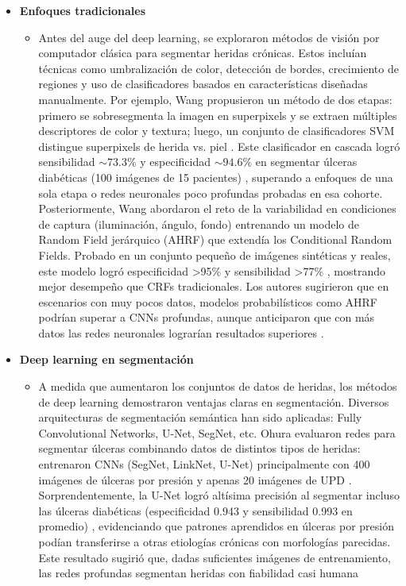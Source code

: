 \begin{itemize}
    \item \textbf{Enfoques tradicionales}
    \begin{itemize}
        \item Antes del auge del deep learning, se exploraron métodos de visión por computador clásica para segmentar heridas crónicas. Estos incluían técnicas como umbralización de color, detección de bordes, crecimiento de regiones y uso de clasificadores basados en características diseñadas manualmente. Por ejemplo, Wang \cite{Chemello2022} propusieron un método de dos etapas: primero se sobresegmenta la imagen en superpixels y se extraen múltiples descriptores de color y textura; luego, un conjunto de clasificadores SVM distingue superpixels de herida vs. piel . Este clasificador en cascada logró sensibilidad $\sim73.3\%$ y especificidad $\sim94.6\%$ en segmentar úlceras diabéticas (100 imágenes de 15 pacientes) , superando a enfoques de una sola etapa o redes neuronales poco profundas probadas en esa cohorte. Posteriormente, Wang \cite{Chemello2022}  abordaron el reto de la variabilidad en condiciones de captura (iluminación, ángulo, fondo) entrenando un modelo de Random Field jerárquico (AHRF) que extendía los Conditional Random Fields. Probado en un conjunto pequeño de imágenes sintéticas y reales, este modelo logró especificidad >95\% y sensibilidad >77\% , mostrando mejor desempeño que CRFs tradicionales. Los autores sugirieron que en escenarios con muy pocos datos, modelos probabilísticos como AHRF podrían superar a CNNs profundas, aunque anticiparon que con más datos las redes neuronales lograrían resultados superiores .
    \end{itemize}
    \item \textbf{Deep learning en segmentación}
    \begin{itemize}
        \item A medida que aumentaron los conjuntos de datos de heridas, los métodos de deep learning demostraron ventajas claras en segmentación. Diversos arquitecturas de segmentación semántica han sido aplicadas: Fully Convolutional Networks, U-Net, SegNet, etc. Ohura evaluaron redes para segmentar úlceras combinando datos de distintos tipos de heridas: entrenaron CNNs (SegNet, LinkNet, U-Net) principalmente con 400 imágenes de úlceras por presión y apenas 20 imágenes de UPD \cite{Chemello2022}. Sorprendentemente, la U-Net logró altísima precisión al segmentar incluso las úlceras diabéticas (especificidad 0.943 y sensibilidad 0.993 en promedio) , evidenciando que patrones aprendidos en úlceras por presión podían transferirse a otras etiologías crónicas con morfologías parecidas. Este resultado sugirió que, dadas suficientes imágenes de entrenamiento, las redes profundas segmentan heridas con fiabilidad casi humana
        

\end{itemize}
\end{itemize}
